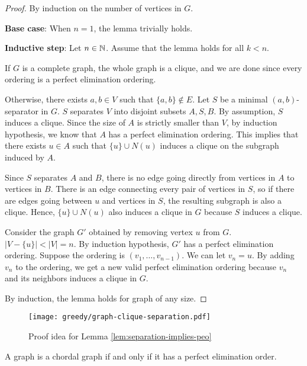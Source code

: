 \begin{proof}
    By induction on the number of vertices in $G$.

    \textbf{Base case}: When $n=1$, the lemma trivially holds.

    \textbf{Inductive step}: Let $n \in \mathbb{N}$. Assume that the lemma holds for all $k < n$.

    If $G$ is a complete graph, the whole graph is a clique, and we are done since every ordering is a perfect elimination ordering.

    Otherwise, there exists $a,b \in V$ such that $\{a,b\} \not\in E$. Let $S$ be a minimal $(a,b)$-separator in $G$. $S$ separates $V$ into disjoint subsets $A,S,B$. By assumption, $S$ induces a clique. Since the size of $A$ is strictly smaller than $V$, by induction hypothesis, we know that $A$ has a perfect elimination ordering. This implies that there exists $u \in A$ such that $\{u\} \cup N(u)$ induces a clique on the subgraph induced by $A$.

    Since $S$ separates $A$ and $B$, there is no edge going directly from vertices in $A$ to vertices in $B$. There is an edge connecting every pair of vertices in $S$, so if there are edges going between $u$ and vertices in $S$, the resulting subgraph is also a clique. Hence, $\{u\} \cup N(u)$ also induces a clique in $G$ because $S$ induces a clique.

    Consider the graph $G'$ obtained by removing vertex $u$ from $G$. $|V-\{u\}| < |V| = n$. By induction hypothesis, $G'$ has a perfect elimination ordering. Suppose the ordering is $(v_1,\ldots,v_{n-1})$. We can let $v_n = u$. By adding $v_n$ to the ordering, we get a new valid perfect elimination ordering because $v_{n}$ and its neighbors induces a clique in $G$.
    
    By induction, the lemma holds for graph of any size.
\end{proof}

\begin{figure}[htbp]
    \centering
    \texttt{[image: greedy/graph-clique-separation.pdf]}
    \caption{Proof idea for Lemma \ref{lem:separation-implies-peo}}
    \label{fig:graph-clique-separation}
\end{figure}

\begin{theorem}
    A graph is a chordal graph if and only if it has a perfect elimination order.
\end{theorem}

